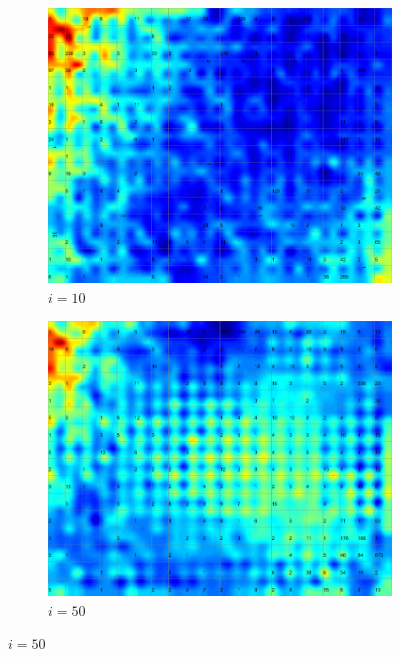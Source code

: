 \documentclass{acm_proc_article-sp}
\begin{document}
\begin{figure}
\centering
    \centering
    \begin{subfigure}[b]{0.24\linewidth}
        \includegraphics[width=\linewidth]{img/wine-newmid-u-matrix-i-10}
        \caption{$i=10$}
        \label{fig:wine-newmid-u-matrix-i-10}
    \end{subfigure}
    \begin{subfigure}[b]{0.24\linewidth}
        \includegraphics[width=\linewidth]{img/wine-newmid-u-matrix-i-50}
        \caption{$i=50$}
        \label{fig:wine-newmid-u-matrix-i-50}
    \end{subfigure}

\end{figure}
\end{document}

